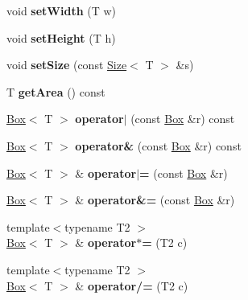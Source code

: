 \begin{DoxyCompactItemize}
\item 
\hypertarget{class_box_a7cfb90348077f6476e5f9aa7ff8d851d}{
void {\bfseries setWidth} (T w)}
\label{class_box_a7cfb90348077f6476e5f9aa7ff8d851d}

\item 
\hypertarget{class_box_a88efe31d53ff3895a3036e7f183152d7}{
void {\bfseries setHeight} (T h)}
\label{class_box_a88efe31d53ff3895a3036e7f183152d7}

\item 
\hypertarget{class_box_acd6d5e40c68328ff7a000574a306483b}{
void {\bfseries setSize} (const \hyperlink{class_size}{Size}$<$ T $>$ \&s)}
\label{class_box_acd6d5e40c68328ff7a000574a306483b}

\item 
\hypertarget{class_box_aa929e8c0b27bef9952ee0609eacf9181}{
T {\bfseries getArea} () const }
\label{class_box_aa929e8c0b27bef9952ee0609eacf9181}

\item 
\hypertarget{class_box_ad98b489652ab9b1e98171bc07c3526b0}{
\hyperlink{class_box}{Box}$<$ T $>$ {\bfseries operator$|$} (const \hyperlink{class_box}{Box} \&r) const }
\label{class_box_ad98b489652ab9b1e98171bc07c3526b0}

\item 
\hypertarget{class_box_a4e303bf9c573dba8cfe7b6f699741040}{
\hyperlink{class_box}{Box}$<$ T $>$ {\bfseries operator\&} (const \hyperlink{class_box}{Box} \&r) const }
\label{class_box_a4e303bf9c573dba8cfe7b6f699741040}

\item 
\hypertarget{class_box_a39321d3603921427af4abc73cf6409df}{
\hyperlink{class_box}{Box}$<$ T $>$ \& {\bfseries operator$|$=} (const \hyperlink{class_box}{Box} \&r)}
\label{class_box_a39321d3603921427af4abc73cf6409df}

\item 
\hypertarget{class_box_acbbf74126e4790b025fdfb4942d5b7e7}{
\hyperlink{class_box}{Box}$<$ T $>$ \& {\bfseries operator\&=} (const \hyperlink{class_box}{Box} \&r)}
\label{class_box_acbbf74126e4790b025fdfb4942d5b7e7}

\item 
\hypertarget{class_box_aa18658b5477c00c191f9b3c855924b2f}{
{\footnotesize template$<$typename T2 $>$ }\\\hyperlink{class_box}{Box}$<$ T $>$ \& {\bfseries operator$\ast$=} (T2 c)}
\label{class_box_aa18658b5477c00c191f9b3c855924b2f}

\item 
\hypertarget{class_box_a51aa00812060d1e4665b4a0be9935cb8}{
{\footnotesize template$<$typename T2 $>$ }\\\hyperlink{class_box}{Box}$<$ T $>$ \& {\bfseries operator/=} (T2 c)}
\label{class_box_a51aa00812060d1e4665b4a0be9935cb8}


\end{DoxyCompactItemize}
